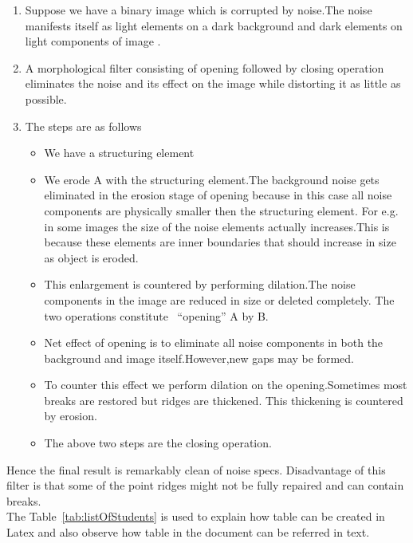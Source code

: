 \begin{enumerate}
	\item Suppose we have a binary image which is corrupted by noise.The noise manifests itself as light elements on a dark background and dark elements on  light components of image .
	\item A morphological filter consisting of opening followed by closing operation eliminates the noise and its effect on the image while distorting it as little as possible.
	\item The steps are as follows

\begin{itemize}
	\item We have a structuring element
	\item We erode A with the structuring element.The background noise gets eliminated in the erosion stage of opening because in this case all noise components are physically smaller then the structuring element.
For e.g. in some images the size of the noise elements actually increases.This is because these elements are inner boundaries that should increase in size as object is eroded.
\item This enlargement is countered by performing dilation.The noise components in the image are reduced in size or deleted completely.
The two operations constitute ~``opening'' A by B.
\item Net effect of opening is to eliminate all noise components in both the background and image itself.However,new gaps may be formed.
\item To counter this effect we perform dilation on the opening.Sometimes most breaks are restored but ridges are thickened.
This thickening is countered by erosion.
\item The above two steps are the closing operation.
\end{itemize}

\end{enumerate}
Hence the final result is remarkably clean of noise specs.
 Disadvantage of this filter is that some of the point ridges might not be fully repaired and can contain breaks. \\


The Table~\ref{tab:listOfStudents} is used to explain how table can be created in Latex and also observe how table in the document can be referred  in text.


